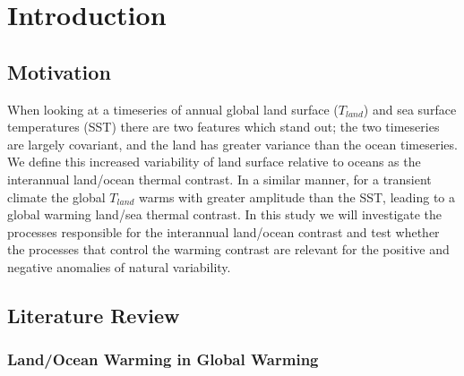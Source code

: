 \chapter{Introduction} %

\label{introduction} %



\section{Motivation}

When looking at a timeseries of annual global land surface ($T_{land}$) and sea 
surface temperatures (SST) there are two features which stand out; the two 
timeseries are largely covariant, and the land has greater variance than the 
ocean timeseries.  We define this increased variability of land surface relative 
to oceans as the interannual land/ocean thermal contrast. In a similar manner, 
for a transient climate the global $T_{land}$ warms with greater amplitude than 
the SST, leading to a global warming land/sea thermal contrast. In this study we 
will investigate the processes responsible for the interannual land/ocean 
contrast and test whether the processes that control the warming contrast are 
relevant for the positive and negative anomalies of natural variability.

\section{Literature Review}

\subsection{Land/Ocean Warming in Global Warming}

